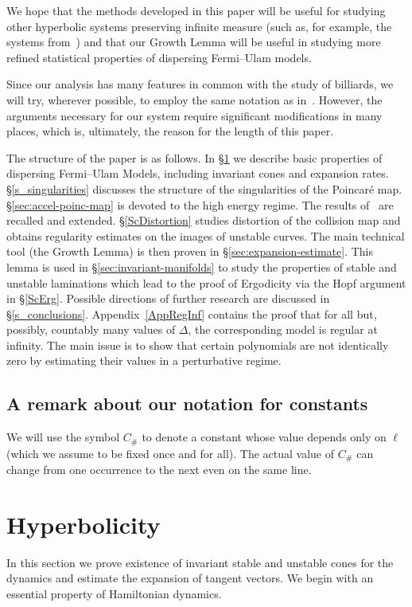 \documentclass[AHL, Unicode, longabstracts,published]{cedram}
\newcommand{\Const}{C_\#}
\begin{document}
We hope that the methods developed in this paper will be useful for studying other hyperbolic systems preserving infinite measure (such as, for example, the systems from~\cite{LY, Zh}) and that our Growth Lemma will be useful in studying more refined statistical properties of dispersing Fermi--Ulam models.

Since our analysis has many features in common with the study of billiards, we will try, wherever possible, to employ the same notation as in~\cite{ChM}. However, the arguments necessary for our system require significant modifications in many places, which is, ultimately, the reason for the length of this paper.

The structure of the paper is as follows. In \S\ref{s_hyperbolicity} we describe basic properties of dispersing Fermi--Ulam Models, including invariant cones and expansion rates. \S\ref{s_singularities} discusses the structure of the singularities of the Poincaré map. \S\ref{sec:accel-poinc-map} is devoted to the high energy regime. The results of~\cite{fum} are recalled and extended. \S\ref{ScDistortion} studies distortion of the collision map and obtains regularity estimates on the images of unstable curves. The main technical tool (the Growth Lemma) is then proven in \S\ref{sec:expansion-estimate}. This lemma is used in \S\ref{sec:invariant-manifolds} to study the properties of stable and unstable laminations which lead to the proof of Ergodicity via the Hopf argument in \S\ref{ScErg}. Possible directions of further research are discussed in \S\ref{s_conclusions}. Appendix~\ref{AppRegInf} contains the proof that for all but, possibly, countably many values of $\Delta$, the corresponding model is regular at infinity. The main issue is to show that certain polynomials are not identically zero by estimating their values in a perturbative regime.


\subsection*{A remark about our notation for constants} 
We will use the symbol $\Const$ to denote a constant whose value depends only on $\ell$ (which we assume to be fixed once and for all). The actual value of $\Const$ can change from one occurrence to the next even on the same line.

\section{Hyperbolicity}\label{s_hyperbolicity}
In this section we prove existence of invariant stable and unstable cones for the dynamics and estimate the expansion of tangent vectors. We begin with an essential property of Hamiltonian dynamics.
\end{document}
